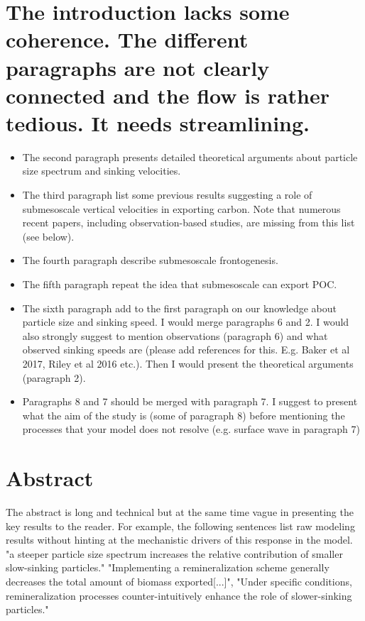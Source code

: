 \documentclass[12pt,letter]{article}
\begin{document}
\section*{The introduction lacks some coherence. The different paragraphs are not clearly connected and the flow is rather tedious. It needs streamlining. }
\begin{itemize}
	\item	The second paragraph presents detailed theoretical arguments about particle size spectrum and sinking velocities. 
	\item	The third paragraph list some previous results suggesting a role of submesoscale vertical velocities in exporting carbon. Note that numerous recent papers, including observation-based studies, are missing from this list (see below).
	\item	The fourth paragraph describe submesoscale frontogenesis.
	\item	The fifth paragraph repeat the idea that submesoscale can export POC.
	\item	The sixth paragraph add to the first paragraph on our knowledge about particle size and sinking speed. I would merge paragraphs 6 and 2. I would also strongly suggest to mention observations (paragraph 6) and what observed sinking speeds are (please add references for this. E.g. Baker et al 2017, Riley et al 2016 etc.). Then I would present the theoretical arguments (paragraph 2). 
	\item	Paragraphs 8 and 7 should be merged with paragraph 7. I suggest to present what the aim of the study is (some of paragraph 8) before mentioning the processes that your model does not resolve (e.g. surface wave in paragraph 7)
\end{itemize}

\section*{Abstract}
The abstract is long and technical but at the same time vague in presenting the key results to the reader. For example, the following sentences list raw modeling results without hinting at the mechanistic drivers of this response in the model. 
"a steeper particle size spectrum increases the relative contribution of smaller slow-sinking particles." "Implementing a remineralization scheme generally decreases the total amount of biomass exported[...]", "Under specific conditions, remineralization processes counter-intuitively enhance the role of slower-sinking particles."
\end{document}
